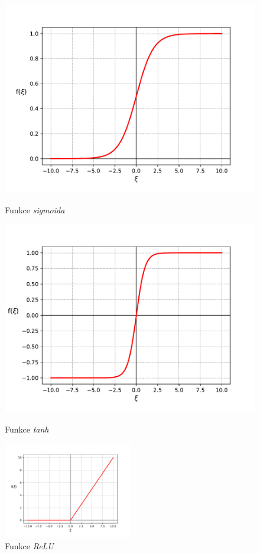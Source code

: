 \begin{figure}[!htb]
    \centering
    \begin{minipage}{0.5\textwidth}
        \centering
        \includegraphics[width=1\textwidth]{../img/graph_sigmoid.pdf}
        \caption{Funkce \emph{sigmoida}}
        \label{fig:graph_sigmoid}
    \end{minipage}%
    \begin{minipage}{0.5\textwidth}
        \centering
        \includegraphics[width=1\textwidth]{../img/graph_tanh.pdf}
        \caption{Funkce \emph{tanh}}
        \label{fig:graph_tanh}
    \end{minipage}
    \includegraphics[width=0.5\textwidth]{../img/graph_relu.pdf}
    \caption{Funkce \emph{ReLU}}
    \label{fig:graph_relu}
\end{figure}

